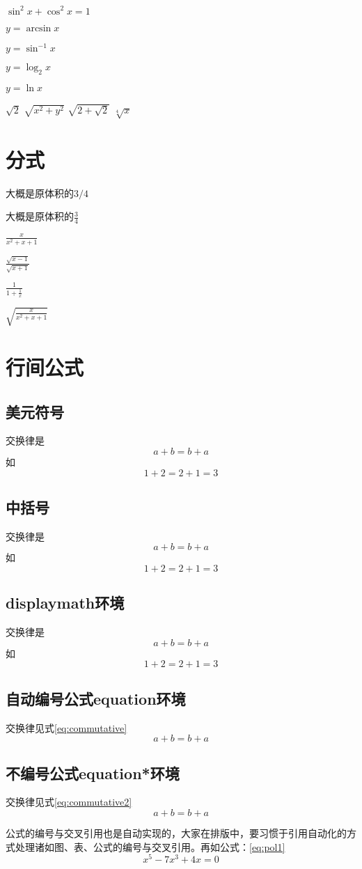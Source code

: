 \documentclass{article}
\begin{document}
	$\sin^2 x + \cos^2 x = 1$
	
	$y = \arcsin x$
	
	$y = \sin^{-1} x$
	
	$y = \log_2 x$
	
	$y = \ln x$
	
	$\sqrt{2}$
	$\sqrt{x^2 + y^2}$
	$\sqrt{2 + \sqrt{2}}$
	$\sqrt[4]{x}$
	\section{分式}
	大概是原体积的$3/4$
	
	大概是原体积的$\frac{3}{4}$
	
	$\frac{x}{x^2 + x +1}$
	
	$\frac{\sqrt{x - 1}}{\sqrt{x + 1}}$
	
	$\frac{1}{1 + \frac{1}{x}}$
	
	$\sqrt{\frac{x}{x^2 + x +1}}$
	\section{行间公式}	
	\subsection{美元符号}
	交换律是
	$$a+b=b+a$$
	如
	$$1+2=2+1=3$$
	\subsection{中括号}
	交换律是
	\[a+b=b+a\]
	如
	\[1+2=2+1=3\]
	\subsection{displaymath环境}
	交换律是
	\begin{displaymath}
		a + b = b + a
	\end{displaymath}
	如
	\begin{displaymath}
		1 + 2 = 2 + 1 = 3
	\end{displaymath}
	\subsection{自动编号公式equation环境}
	交换律见式\ref{eq:commutative}
	\begin{equation}
		a + b = b + a \label{eq:commutative}
	\end{equation}
	\subsection{不编号公式equation*环境}
	交换律见式\ref{eq:commutative2}
	\begin{equation*}
		a + b = b + a \label{eq:commutative2}
	\end{equation*}

	公式的编号与交叉引用也是自动实现的，大家在排版中，要习惯于引用自动化的方式处理诸如图、表、公式的编号与交叉引用。再如公式：\ref{eq:pol1}
	\begin{equation}
		x^5 - 7x^3 + 4x = 0 \label{eq:pol1}
	\end{equation}
\end{document}
